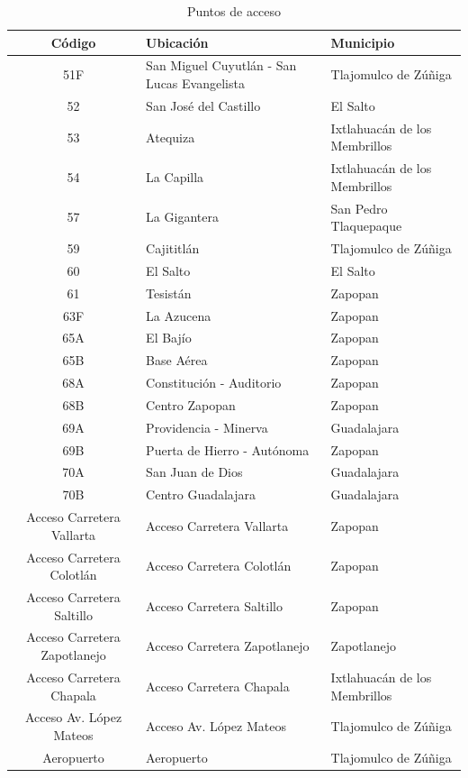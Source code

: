 \documentclass[openany]{book}
\begin{document}
            \begin{table}[H]
            \centering
            \small
            \begin{tabular}{|c|l|l|}
            \hline
            \textbf{Código} & \textbf{Ubicación} & \textbf{Municipio} \\
            \hline
            51F & San Miguel Cuyutlán - San Lucas Evangelista & Tlajomulco de Zúñiga \\
            52 & San José del Castillo & El Salto \\
            53 & Atequiza & Ixtlahuacán de los Membrillos \\
            54 & La Capilla & Ixtlahuacán de los Membrillos \\
            57 & La Gigantera & San Pedro Tlaquepaque \\
            59 & Cajititlán & Tlajomulco de Zúñiga \\
            60 & El Salto & El Salto \\
            61 & Tesistán & Zapopan \\
            63F & La Azucena & Zapopan \\
            65A & El Bajío & Zapopan \\
            65B & Base Aérea & Zapopan \\
            68A & Constitución - Auditorio & Zapopan \\
            68B & Centro Zapopan & Zapopan \\
            69A & Providencia - Minerva & Guadalajara \\
            69B & Puerta de Hierro - Autónoma & Zapopan \\
            70A & San Juan de Dios & Guadalajara \\
            70B & Centro Guadalajara & Guadalajara \\
            Acceso Carretera Vallarta & Acceso Carretera Vallarta & Zapopan \\
            Acceso Carretera Colotlán & Acceso Carretera Colotlán & Zapopan \\
            Acceso Carretera Saltillo & Acceso Carretera Saltillo & Zapopan \\
            Acceso Carretera Zapotlanejo & Acceso Carretera Zapotlanejo & Zapotlanejo \\
            Acceso Carretera Chapala & Acceso Carretera Chapala & Ixtlahuacán de los Membrillos \\
            Acceso Av. López Mateos & Acceso Av. López Mateos & Tlajomulco de Zúñiga \\
            Aeropuerto & Aeropuerto & Tlajomulco de Zúñiga \\
            \hline
            \end{tabular}
            \caption{Puntos de acceso}
            \label{tab:accesos}
            \end{table}
\end{document}

